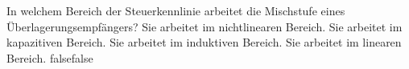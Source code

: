     {In welchem Bereich der Steuerkennlinie arbeitet die Mischstufe eines Überlagerungsempfängers? }
    {Sie arbeitet im nichtlinearen Bereich.}
    {Sie arbeitet im kapazitiven Bereich.}
    {Sie arbeitet im induktiven Bereich.}
    {Sie arbeitet im linearen Bereich.}
    {false}{false}